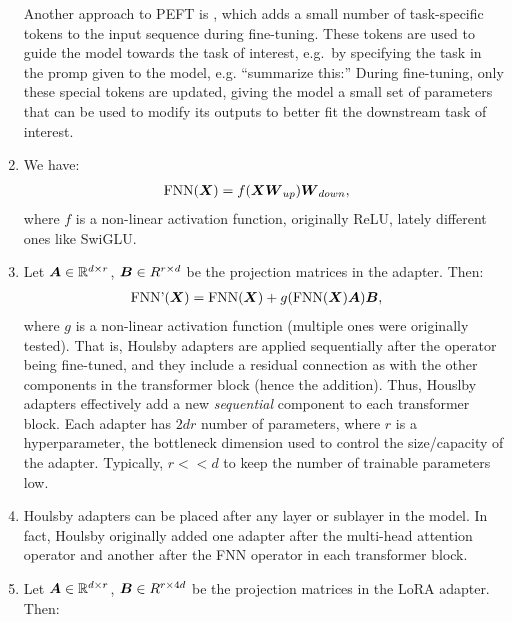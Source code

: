\documentclass[11pt,a4paper]{article}
\newcommand\op[1]{\operatorname{#1}}
\begin{document}
\begin{enumerate}[label=(\alph*)]
          Another approach to PEFT is , which adds a
          small number of task-specific tokens to the input sequence during
          fine-tuning.
          These tokens are used to guide the model towards the task of
          interest, e.g.\ by specifying the task in the promp given to the
          model, e.g. ``summarize this:''
          During fine-tuning, only these special tokens are updated, giving
          the model a small set of parameters that can be used to modify its
          outputs to better fit the downstream task of interest.
    \item We have:
          \begin{align}
              \op{FNN}(\mX) & = f(\mX\mW_{up})\mW_{down},
          \end{align}
          where $f$ is a non-linear activation function, originally ReLU,
          lately different ones like SwiGLU.
    \item Let ${\boldsymbol{A}} \in \mathbb{R}^{d\times r}$, ${\boldsymbol{B}} \in R^{r\times d}$ be the
          projection matrices in the adapter.
          Then:
          \begin{align}\label{houlsby}
              \op{FNN'}(\mX) & =  \op{FNN}(\mX) + g(\op{FNN}(\mX)\mA)\mB,
          \end{align}
          where $g$ is a non-linear activation function (multiple ones were
          originally tested).
          That is, Houlsby adapters are applied sequentially after the operator
          being fine-tuned, and they include a residual connection as with the
          other components in the transformer block (hence the addition).
          Thus, Houslby adapters effectively add a new \emph{sequential}
          component to each transformer block.
          Each adapter has $2dr$ number of parameters, where $r$ is
          a hyperparameter, the bottleneck dimension used to control the
          size/capacity of the adapter.
          Typically, $r << d$ to keep the number of trainable parameters low.
    \item Houlsby adapters can be placed after any layer or sublayer in the
          model. In fact, Houlsby originally added one adapter after the
          multi-head attention operator and another after the FNN operator in
          each transformer block.
    \item Let ${\boldsymbol{A}} \in \mathbb{R}^{d\times r}$, ${\boldsymbol{B}} \in R^{r\times 4d}$ be the
          projection matrices in the LoRA adapter.
          Then:
          \begin{align}\label{lora}

\end{align}
\end{enumerate}
\end{document}
